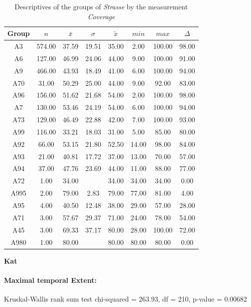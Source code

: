 \begin{table}[ht]
	\tiny
	\centering
	\begin{tabular}{c|c|c|c|c|c|c|c}
	  	\toprule
	 	Group & $n$ & $\bar{x}$ & $\sigma$ & $\tilde{x}$ & $min$ & $max$ & $\Delta$ \\   
	  	\midrule
		A3 & 574.00 & 37.59 & 19.51 & 35.00 & 2.00 & 100.00 & 98.00 \\ 
	  	A6 & 127.00 & 46.99 & 24.06 & 44.00 & 9.00 & 100.00 & 91.00 \\ 
	  	A9 & 466.00 & 43.93 & 18.49 & 41.00 & 6.00 & 100.00 & 94.00 \\ 
	  	A70 & 31.00 & 50.29 & 25.00 & 44.00 & 9.00 & 92.00 & 83.00 \\ 
	  	A96 & 156.00 & 51.62 & 21.68 & 54.00 & 2.00 & 100.00 & 98.00 \\ 
	  	A7 & 130.00 & 53.46 & 24.19 & 54.00 & 6.00 & 100.00 & 94.00 \\ 
	  	A73 & 129.00 & 46.49 & 22.88 & 42.00 & 7.00 & 100.00 & 93.00 \\ 
	  	A99 & 116.00 & 33.21 & 18.03 & 31.00 & 5.00 & 85.00 & 80.00 \\ 
	  	A92 & 66.00 & 53.15 & 21.80 & 52.50 & 14.00 & 98.00 & 84.00 \\ 
	  	A93 & 21.00 & 40.81 & 17.72 & 37.00 & 13.00 & 70.00 & 57.00 \\ 
	  	A94 & 37.00 & 47.76 & 23.69 & 44.00 & 11.00 & 88.00 & 77.00 \\ 
	  	A72 & 1.00 & 34.00 &  & 34.00 & 34.00 & 34.00 & 0.00 \\ 
	  	A995 & 2.00 & 79.00 & 2.83 & 79.00 & 77.00 & 81.00 & 4.00 \\ 
	  	A95 & 4.00 & 40.50 & 12.48 & 38.00 & 29.00 & 57.00 & 28.00 \\ 
	  	A71 & 3.00 & 57.67 & 29.37 & 71.00 & 24.00 & 78.00 & 54.00 \\ 
	  	A45 & 3.00 & 69.33 & 37.17 & 80.00 & 28.00 & 100.00 & 72.00 \\ 
	  	A980 & 1.00 & 80.00 &  & 80.00 & 80.00 & 80.00 & 0.00 \\ 
	  	\bottomrule
	\end{tabular}
	\caption{Descriptives of the groups of \textit{Strasse} by the measurement \textit{Coverage}}
\end{table}

\large
\centerline{\textbf{Kat}}
\normalsize

\paragraph{Maximal temporal Extent:}
Kruskal-Wallis rank sum test chi-squared = 263.93, df = 210, p-value = 0.00682

